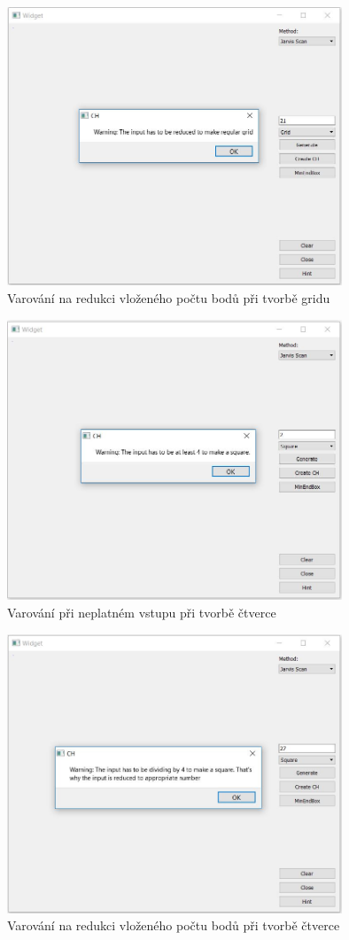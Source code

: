 \documentclass[a4paper, 12pt]{article}
\begin{document}
\begin{figure}[h!]
	\centering
	\includegraphics[width=10cm]{warning_grid.jpg}
	\caption{Varování na redukci vloženého počtu bodů při tvorbě gridu }
\end{figure}

\begin{figure}[h!]
	\centering
	\includegraphics[width=10cm]{warning_square.jpg}
	\caption{Varování při neplatném vstupu při tvorbě čtverce}
\end{figure}

\begin{figure}[h!]
	\centering
	\includegraphics[width=10cm]{warning_square2.jpg}
	\caption{Varování na redukci vloženého počtu bodů při tvorbě čtverce}
\end{figure}
\end{document}
